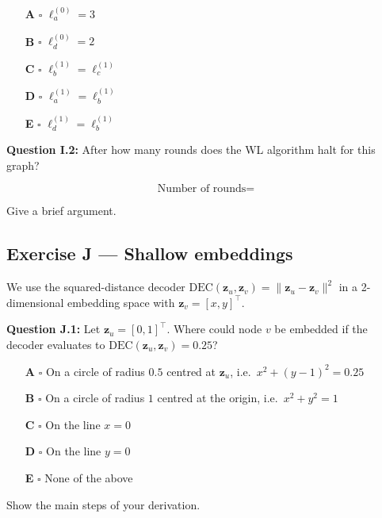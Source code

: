 \documentclass[12pt,a4paper]{article}
\begin{document}
\begin{itemize}[noitemsep,label={}]
  \item[\textbf{A}] $\square$ \quad $\ell^{(0)}_a = 3$
  \item[\textbf{B}] $\square$ \quad $\ell^{(0)}_d = 2$
  \item[\textbf{C}] $\square$ \quad $\ell^{(1)}_b = \ell^{(1)}_c$
  \item[\textbf{D}] $\square$ \quad $\ell^{(1)}_a = \ell^{(1)}_b$
  \item[\textbf{E}] $\square$ \quad $\ell^{(1)}_d = \ell^{(1)}_b$
\end{itemize}

\textbf{Question I.2:} After how many rounds does the WL algorithm halt for this graph?

\[
  \text{Number of rounds} =
\]

Give a brief argument.

\vspace{3cm}

\newpage
\subsection*{Exercise J --- Shallow embeddings}

We use the squared-distance decoder $\mathrm{DEC}(\mathbf{z}_u,\mathbf{z}_v) = \|\mathbf{z}_u-\mathbf{z}_v\|^2$
in a 2-dimensional embedding space with $\mathbf{z}_v=[x,y]^\top$.

\textbf{Question J.1:} Let $\mathbf{z}_u=[0,1]^\top$.  Where could node $v$ be embedded if the
decoder evaluates to $\mathrm{DEC}(\mathbf{z}_u,\mathbf{z}_v)=0.25$?

\begin{itemize}[noitemsep,label={}]
  \item[\textbf{A}] $\square$ \quad On a circle of radius $0.5$ centred at $\mathbf{z}_u$,
    i.e.\ $x^2+(y-1)^2=0.25$
  \item[\textbf{B}] $\square$ \quad On a circle of radius $1$ centred at the origin,
    i.e.\ $x^2+y^2=1$
  \item[\textbf{C}] $\square$ \quad On the line $x=0$
  \item[\textbf{D}] $\square$ \quad On the line $y=0$
  \item[\textbf{E}] $\square$ \quad None of the above
\end{itemize}

Show the main steps of your derivation.

\vspace{4cm}
\end{document}
